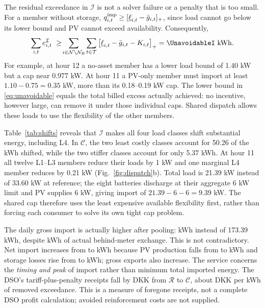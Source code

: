 \documentclass[10pt,a4paper]{article}
\newcommand{\pos}[1]{\left[#1\right]_+}
\newcommand{\Rmod}{\mathcal R}
\newcommand{\Imod}{\mathcal I}
\newcommand{\Cmod}{\mathcal C}
\newcommand{\kWh}{\mathrm{kWh}}
\begin{document}
The residual exceedance in $\Imod$ is not a solver failure or a penalty that is too small. For a member without storage, $q_{i,t}^{\rm imp}\ge [\underline\ell_{i,t}-\bar g_{i,t}]_+$, since load cannot go below its lower bound and PV cannot exceed availability. Consequently,
\begin{equation}
\sum_{i,t}e_{i,t}^{\Imod}
\ \geq\!
\sum_{i\in\mathcal N\setminus\mathcal N_{\rm B}}
\sum_{t\in\mathcal T}\pos{\underline\ell_{i,t}-\bar g_{i,t}-K_{i,t}}
=\UnavoidableI\ \kWh .
\label{eq:unavoidable}
\end{equation}
For example, at hour 12 a no-asset member has a lower load bound of 1.40 kW but a cap near 0.977 kW. At hour 11 a PV-only member must import at least $1.10-0.75=0.35$ kW, more than its 0.18--0.19 kW cap. The lower bound in \eqref{eq:unavoidable} equals the total billed excess actually achieved: no incentive, however large, can remove it under those individual caps. Shared dispatch allows these loads to use the flexibility of the other members.

\begin{table}[H]
    \centering\small
    \caption{Energy shifted relative to the preferred profile, summed over the four members per class (kWh/day).}
    \label{tab:shifts}
    
\end{table}
Table~\ref{tab:shifts} reveals that $\Imod$ makes all four load classes shift substantial energy, including L4. In $\Cmod$, the two least costly classes account for 50.26 of the \Cshift{} kWh shifted, while the two stiffer classes account for only 5.37 kWh. At hour 11 all twelve L1--L3 members reduce their loads by 1 kW and one marginal L4 member reduces by 0.21 kW (Fig.~\ref{fig:dispatch}b). Total load is 21.39 kW instead of 33.60 kW at reference; the eight batteries discharge at their aggregate 6 kW limit and PV supplies 6 kW, giving import of $21.39-6-6=9.39$ kW. The shared cap therefore uses the least expensive available flexibility first, rather than forcing each consumer to solve its own tight cap problem.

The daily gross import is actually higher after pooling: \Cimp{} kWh instead of 173.39 kWh, despite \Cexchange{} kWh of actual behind-meter exchange. This is not contradictory. Net import increases from \Rnet{} to \Cnet{} kWh because PV production falls from \Rpv{} to \Cpv{} kWh and storage losses rise from \Rlosses{} to \Closses{} kWh; gross exports also increase. The service concerns the \emph{timing and peak} of import rather than minimum total imported energy. The DSO's tariff-plus-penalty receipts fall by \DSOreceiptsLost{} DKK from $\Rmod$ to $\Cmod$, about \DSOreceiptPerRelief{} DKK per kWh of removed exceedance. This is a measure of foregone receipts, not a complete DSO profit calculation; avoided reinforcement costs are not supplied.
\end{document}
